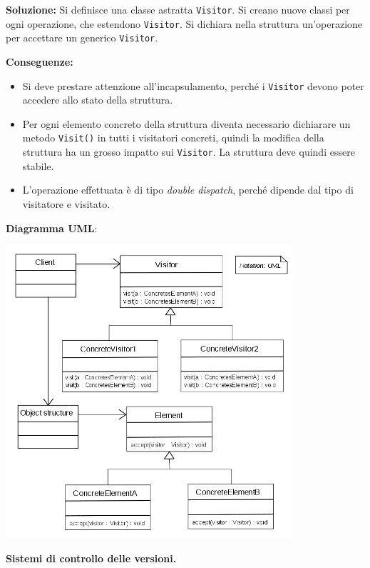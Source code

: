 \documentclass[answers, a4paper, 11pt]{exam}
\begin{document}
\begin{questions}
\begin{parts}
\begin{solution}
\textbf{Soluzione:} Si definisce una classe astratta \texttt{Visitor}.
Si creano nuove classi per ogni operazione, che estendono \texttt{Visitor}.
Si dichiara nella struttura un'operazione per accettare un generico \texttt{Visitor}. 

\textbf{Conseguenze:}
\begin{itemize}
    \item Si deve prestare attenzione all'incapsulamento, perché i \texttt{Visitor} devono poter accedere allo stato della struttura.
    \item Per ogni elemento concreto della struttura diventa necessario dichiarare un metodo \texttt{Visit()} in tutti i visitatori concreti, quindi la modifica della struttura ha un grosso impatto sui \texttt{Visitor}. La struttura deve quindi essere stabile.
    \item L'operazione effettuata è di tipo \textit{double dispatch}, perché dipende dal tipo di visitatore e visitato.
\end{itemize}

\textbf{Diagramma UML}:

{\centering

\includegraphics[width=0.8\textwidth]{Visitor}

}


\end{solution}


\end{parts}

\question \textbf{Sistemi di controllo delle versioni.}
\begin{parts}

\end{parts}
\end{questions}
\end{document}
